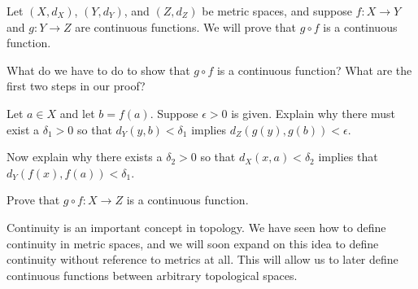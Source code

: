 \begin{activity}  Let $(X, d_X)$, $(Y,d_Y)$, and $(Z, d_Z)$ be metric spaces, and suppose $f: X \to Y$ and $g: Y \to Z$ are continuous functions. We will prove that $g \circ f$ is a continuous function. 
	\ba
	\item What do we have to do to show that $g \circ f$ is a continuous function? What are the first two steps in our proof?
		
	\item Let $a \in X$ and let $b = f(a)$. Suppose $\epsilon > 0$ is given. Explain why there must exist a $\delta_1 > 0$ so that $d_Y(y,b) < \delta_1$ implies $d_Z(g(y), g(b)) < \epsilon$. 
		
	\item Now explain why there exists a $\delta_2 > 0$ so that $d_X(x,a) < \delta_2$ implies that $d_Y(f(x), f(a)) < \delta_1$. 
		
	\item Prove that $g \circ f : X \to Z$ is a continuous function.
			
	\ea
\end{activity}

\begin{comment}

\ActivitySolution
	\ba
	\item We have to start with a point $a \in X$ and an $\epsilon$ greater than $0$. We have to find a positive number $\delta$ such that $d_X(x,a) < \delta$ implies that $d_Z((g \circ f)(x), (g \circ f)(a)) < \epsilon$. 
		
	\item Since $g$ is continuous at $b$, there exists a $\delta_1 > 0$ so that $d_Y(y,b)  < \delta_1$ implies $d_Z(g(y), g(b)) < \epsilon$. 
		
	\item Since $f$ is continuous at $a$, there exists a $\delta_2 > 0$ so that $d_X(x,a) < \delta_2$ implies that $d_Y(f(x), f(a)) < \delta_1$ (here we are using $\delta_1$ as our $\epsilon$). 
		
	\item Let $\delta = \delta_2$ and suppose that $d_X(x,a) < \delta$. Then $d_Y(f(x),f(a)) < \delta_1$. But then $d_Z(g(f(x)), g(f(a)) < \epsilon$. This shows that $g \circ f : X \to Z$ is a continuous function.
			
	\ea

\end{comment}


Continuity is an important concept in topology. We have seen how to define continuity in metric spaces, and we will soon expand on this idea to define continuity without reference to metrics at all. This will allow us to later define continuous functions between arbitrary topological spaces. 


